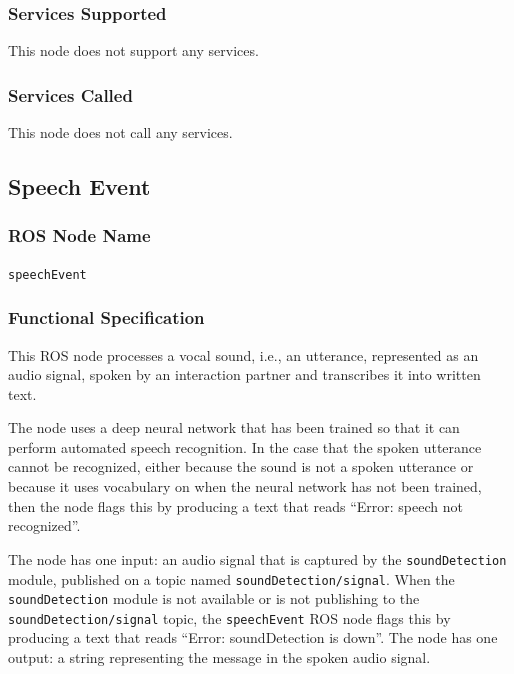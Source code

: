 \documentclass{CSSRforAfrica}
\begin{document}
{{\subsubsection*{Services Supported}
This node  does not support any services.

\subsubsection*{Services Called}
This node does not call any services.








\newpage

\subsection{Speech Event }

\subsubsection*{ROS Node Name}
 {\small \verb+speechEvent+}   

\subsubsection*{Functional Specification}
This ROS node processes a vocal sound, i.e., an utterance, represented as an audio signal, spoken by an interaction partner and transcribes it into written text.

The node uses a deep neural network that has been trained so that it can perform automated speech recognition.  In the case that the spoken utterance cannot be recognized, either because the sound is not a spoken utterance or because it uses vocabulary on when the neural network has not been trained, then the node flags this by producing a text that reads ``Error: speech not recognized''.  
 
The node has one input: an audio signal that is captured by the  {\small \verb+soundDetection+} module, published on a  topic named {\small \verb+soundDetection/signal+}. When the {\small \verb+soundDetection+} module is not available or is not publishing  to the  {\small \verb+soundDetection/signal+} topic, the  {\small \verb+speechEvent+} ROS node flags this by producing a text that reads ``Error: soundDetection is down''. The node has one output: a string representing the message in the spoken audio signal.

}}
\end{document}
